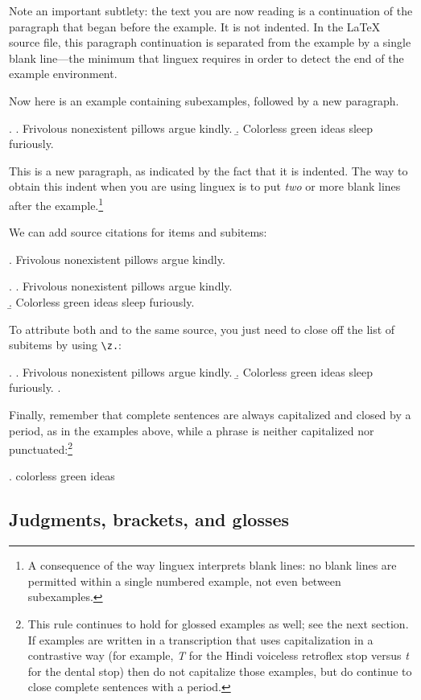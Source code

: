 \documentclass[letterpaper,12pt, twoside]{article}
\begin{document}
Note an important subtlety: the text you are now reading is a continuation of the paragraph that began before the example. It is not indented. In the LaTeX source file, this paragraph continuation is separated from the example by a single blank line---the minimum that {linguex} requires in order to detect the end of the example environment. 

Now here is an example containing subexamples, followed by a new paragraph.

\ex. 
\a. Frivolous nonexistent pillows argue kindly.
\b. Colorless green ideas sleep furiously.


This is a new paragraph, as indicated by the fact that it is indented. The way to obtain this indent when you are using {linguex} is to put \emph{two} or more blank lines after the example.\footnote{A consequence of the way {linguex} interprets blank lines: no blank lines are permitted within a single numbered example, not even between subexamples.} 

We can add source citations for items and subitems:

\ex. Frivolous nonexistent pillows argue kindly.\\\citep{journalarticle}

\ex. 
\a. Frivolous nonexistent pillows argue kindly. \\\citep{journalarticle}
\b. Colorless green ideas sleep furiously.\\\citep{book}

To attribute both \Last[a] and \Last[b] to the same source, you just need to close off the list of subitems by using \verb|\z.|:

\ex. 
\a. Frivolous nonexistent pillows argue kindly. 
\b. Colorless green ideas sleep furiously.
\z. \citep{journalarticle}

Finally, remember that complete sentences are always capitalized  and closed by a period, as in the examples above, while a phrase is neither capitalized nor punctuated:\footnote{This rule continues to hold for glossed examples as well; see the next section. If examples are written in a transcription that uses capitalization in a contrastive way (for example, \emph{T} for the Hindi voiceless retroflex stop versus \emph{t} for the dental stop) then do not capitalize those examples, but do continue to close complete sentences with a period.}

\ex. colorless green ideas


\subsection{Judgments, brackets, and glosses}\label{secjbg}
\end{document}
